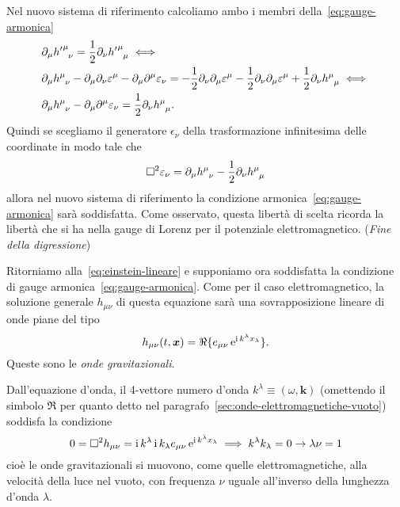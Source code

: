 Nel nuovo sistema di riferimento calcoliamo ambo i membri
della~\eqref{eq:gauge-armonica}
\begin{equation}
  \begin{split}
    &\partial_{\mu} \tensor{{h'}}{^{\mu}_{\nu}} = \frac{1}{2}\partial_{\nu}
    \tensor{{h'}}{^{\mu}_{\mu}} \iff \\
    &\partial_{\mu} \tensor{h}{^{\mu}_{\nu}}
    - \partial_{\mu} \partial_{\nu} \epsilon^{\mu}
    - \partial_{\mu}\partial^{\mu} \epsilon_{\nu}
    = -\frac{1}{2} \partial_{\nu} \partial_{\mu} \epsilon^{\mu} -
    \frac{1}{2}\partial_{\nu} \partial_{\mu} \epsilon^{\mu} +
    \frac{1}{2} \partial_{\nu} \tensor{h}{^{\mu}_{\mu}} \iff \\
    &\partial_{\mu} \tensor{h}{^{\mu}_{\nu}}
    - \partial_{\mu}\partial^{\mu} \epsilon_{\nu}
    = \frac{1}{2} \partial_{\nu} \tensor{h}{^{\mu}_{\mu}}.
  \end{split}
\end{equation}
Quindi se scegliamo il generatore $\epsilon_{\nu}$ della trasformazione
infinitesima delle coordinate in modo tale che
\begin{equation}
  \dalamb \epsilon_{\nu} = \partial_{\mu} \tensor{h}{^{\mu}_{\nu}} -
  \frac{1}{2} \partial_{\nu} \tensor{h}{^{\mu}_{\mu}}
\end{equation}
allora nel nuovo sistema di riferimento la condizione
armonica~\eqref{eq:gauge-armonica} sarà soddisfatta.  Come osservato, questa
libertà di scelta ricorda la libertà che si ha nella gauge di Lorenz per il
potenziale elettromagnetico. (\emph{Fine della digressione})

Ritorniamo alla~\eqref{eq:einstein-lineare} e supponiamo ora soddisfatta la
condizione di gauge armonica~\eqref{eq:gauge-armonica}.  Come per il caso
elettromagnetico, la soluzione generale $h_{\mu\nu}$ di questa equazione sarà
una sovrapposizione lineare di onde piane del tipo
\begin{equation}
  h_{\mu\nu}(t,\bm{x}) = \Re\{e_{\mu\nu} \operatorname{\mathrm{e}}^{\operatorname{\mathrm{i}} k^{\lambda}x_{\lambda}} \}.
\end{equation}
Queste sono le \emph{onde gravitazionali}.

Dall'equazione d'onda, il 4-vettore numero d'onda $k^{\lambda} \equiv (\omega,
\bm{k})$ (omettendo il simbolo $\Re$ per quanto detto nel
paragrafo~\ref{sec:onde-elettromagnetiche-vuoto}) soddisfa la condizione
\begin{equation}
  0 = \Box^{2} h_{\mu\nu} = \operatorname{\mathrm{i}} k^{\lambda} \operatorname{\mathrm{i}} k_{\lambda} e_{\mu\nu}
  \operatorname{\mathrm{e}}^{\operatorname{\mathrm{i}} k^{\lambda}x_{\lambda}} \implies k^{\lambda}k_{\lambda} = 0 \rightarrow \lambda \nu=1
\end{equation}
cioè le onde gravitazionali si muovono, come quelle elettromagnetiche, alla
velocità della luce nel vuoto, con frequenza $\nu$ uguale all'inverso della
lunghezza d'onda $\lambda$.

